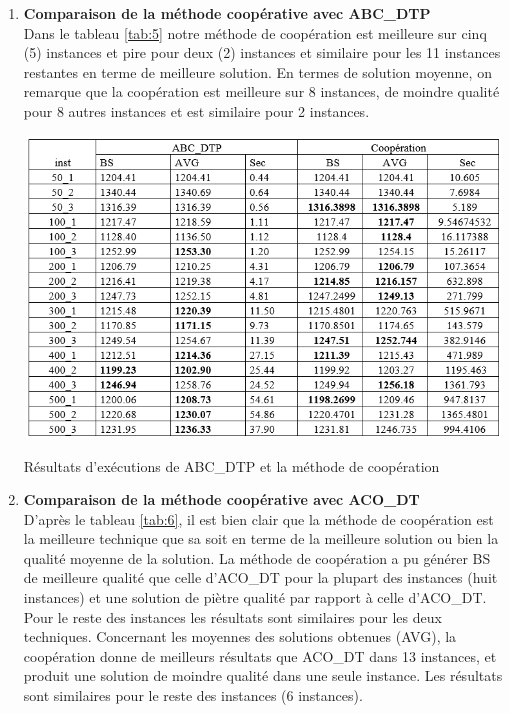\begin{enumerate}[label=\alph*)]
	\item \textbf{Comparaison de  la méthode coopérative avec ABC\_DTP}\\
	Dans le tableau \ref{tab:5} notre méthode de coopération est meilleure sur cinq (5) instances et pire pour deux (2) instances et similaire pour les 11 instances restantes en terme de meilleure solution. En termes de solution moyenne, on remarque que la coopération est meilleure sur 8 instances, de moindre qualité pour 8 autres instances et est similaire pour 2 instances.
	
\begin{table}[H]
	\includegraphics[width=15cm,height=8cm]{Chap5/t5.png}
	\caption{Résultats d’exécutions de ABC\_DTP et la méthode de coopération}
	\label{tab:5}
\end{table}

	\item \textbf{Comparaison de  la méthode coopérative avec ACO\_DT}\\
	D’après le tableau \ref{tab:6}, il est bien clair que la méthode de coopération est la meilleure technique que sa soit en terme de la meilleure solution ou bien la qualité moyenne de la solution. La méthode de coopération a pu générer BS de meilleure qualité que celle d’ACO\_DT pour la plupart des instances (huit instances) et une solution de piètre qualité par rapport à celle d’ACO\_DT. Pour le reste des instances les résultats sont similaires pour les deux techniques. Concernant les moyennes des solutions obtenues (AVG), la coopération donne de meilleurs résultats que ACO\_DT dans 13 instances, et produit une solution de moindre qualité dans une seule instance. Les résultats sont similaires pour le reste des instances (6 instances).
	

\end{enumerate}
